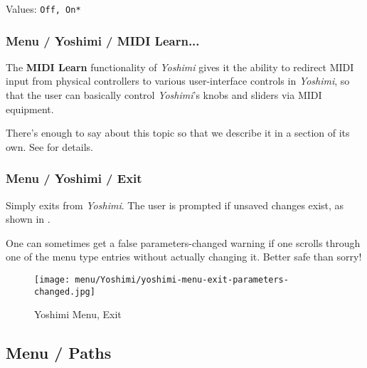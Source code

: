    Values: \texttt{Off, On*}

\subsubsection{Menu / Yoshimi / MIDI Learn...}
\label{subsubsec:menu_yoshimi_midi_learn}

   The \textbf{MIDI Learn} functionality of \textsl{Yoshimi} gives it the
   ability to redirect MIDI input from physical controllers to various
   user-interface controls in \textsl{Yoshimi}, so that the user can basically
   control \textsl{Yoshimi}'s knobs and sliders via MIDI equipment.

   There's enough to say about this topic so that we describe it in a section
   of its own.
   See  for details.

\subsubsection{Menu / Yoshimi / Exit}
\label{subsubsec:menu_yoshimi_exit}

   Simply exits from \textsl{Yoshimi}.
   The user is prompted if unsaved changes exist, as shown in
   .

   One can sometimes get a false parameters-changed warning if one
   scrolls through one of the menu type entries without actually changing it.
   Better safe than sorry!

\begin{figure}[H]
   \centering 
   \texttt{[image: menu/Yoshimi/yoshimi-menu-exit-parameters-changed.jpg]}
   \caption[Yoshimi Menu, Exit]{Yoshimi Menu, Exit}
   \label{fig:yoshimi_change_exit}
\end{figure}

%
% 





%

\subsection{Menu / Paths}
\label{subsec:menu_paths}

